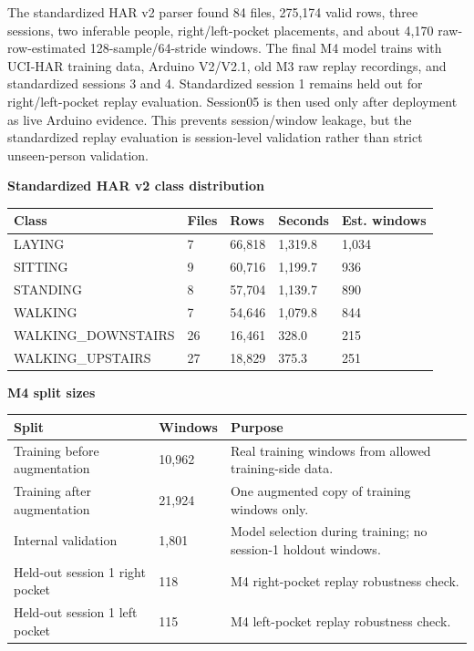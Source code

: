 \documentclass[11pt,a4paper]{article}
\begin{document}
The standardized HAR v2 parser found 84 files, 275,174 valid rows, three sessions, two inferable people, right/left-pocket placements, and about 4,170 raw-row-estimated 128-sample/64-stride windows. The final M4 model trains with UCI-HAR training data, Arduino V2/V2.1, old M3 raw replay recordings, and standardized sessions 3 and 4. Standardized session 1 remains held out for right/left-pocket replay evaluation. Session05 is then used only after deployment as live Arduino evidence. This prevents session/window leakage, but the standardized replay evaluation is session-level validation rather than strict unseen-person validation.

\textbf{Standardized HAR v2 class distribution}

\begin{center}
\small
\begin{tabular}{|p{3.7cm}|p{1.2cm}|p{2.0cm}|p{2.0cm}|p{2.0cm}|}
\hline
\rowcolor{headergray}
\textbf{Class} & \textbf{Files} & \textbf{Rows} & \textbf{Seconds} & \textbf{Est. windows}\\
\hline
LAYING & 7 & 66,818 & 1,319.8 & 1,034\\
\hline
SITTING & 9 & 60,716 & 1,199.7 & 936\\
\hline
STANDING & 8 & 57,704 & 1,139.7 & 890\\
\hline
WALKING & 7 & 54,646 & 1,079.8 & 844\\
\hline
WALKING\_DOWNSTAIRS & 26 & 16,461 & 328.0 & 215\\
\hline
WALKING\_UPSTAIRS & 27 & 18,829 & 375.3 & 251\\
\hline
\end{tabular}
\end{center}
\normalsize

\textbf{M4 split sizes}

\begin{center}
\small
\begin{tabular}{|p{4.6cm}|p{2.2cm}|p{6.0cm}|}
\hline
\rowcolor{headergray}
\textbf{Split} & \textbf{Windows} & \textbf{Purpose}\\
\hline
Training before augmentation & 10,962 & Real training windows from allowed training-side data.\\
\hline
Training after augmentation & 21,924 & One augmented copy of training windows only.\\
\hline
Internal validation & 1,801 & Model selection during training; no session-1 holdout windows.\\
\hline
Held-out session 1 right pocket & 118 & M4 right-pocket replay robustness check.\\
\hline
Held-out session 1 left pocket & 115 & M4 left-pocket replay robustness check.\\
\hline
\end{tabular}
\end{center}
\normalsize
\end{document}
